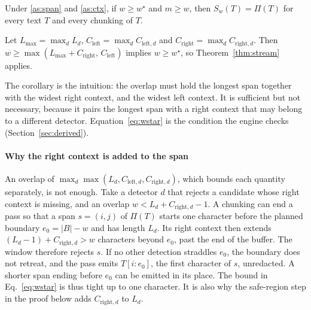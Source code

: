 \documentclass[pdflatex,sn-mathphys-num]{sn-jnl}
\theoremstyle{\ssThmStyle}
\theoremstyle{\ssDefStyle}
\begin{document}
\begin{theorem}\label{thm:stream}
Under \ref{as:span} and \ref{as:ctx}, if $w \ge w^{\star}$ and $m \ge w$, then $S_w(T) = \Pi(T)$ for every text $T$ and every chunking of $T$.
\end{theorem}

\begin{corollary}\label{cor:coarse}
Let $L_{\max} = \max_d L_d$, $C_{\mathrm{left}} = \max_d C_{\mathrm{left},d}$ and $C_{\mathrm{right}} = \max_d C_{\mathrm{right},d}$. Then $w \ge \max(L_{\max} + C_{\mathrm{right}},\, C_{\mathrm{left}})$ implies $w \ge w^{\star}$, so Theorem~\ref{thm:stream} applies.
\end{corollary}

The corollary is the intuition: the overlap must hold the longest span together with the widest right context, and the widest left context. It is sufficient but not necessary, because it pairs the longest span with a right context that may belong to a different detector. Equation~\eqref{eq:wstar} is the condition the engine checks (Section~\ref{sec:derived}).

\paragraph{Why the right context is added to the span}
An overlap of $\max_d \max(L_d, C_{\mathrm{left},d}, C_{\mathrm{right},d})$, which bounds each quantity separately, is not enough. Take a detector $d$ that rejects a candidate whose right context is missing, and an overlap $w < L_d + C_{\mathrm{right},d} - 1$. A chunking can end a pass so that a span $s = (i, j)$ of $\Pi(T)$ starts one character before the planned boundary $e_0 = |B| - w$ and has length $L_d$. Its right context then extends $(L_d - 1) + C_{\mathrm{right},d} > w$ characters beyond $e_0$, past the end of the buffer. The window therefore rejects $s$. If no other detection straddles $e_0$, the boundary does not retreat, and the pass emits $T[i : e_0]$, the first character of $s$, unredacted. A shorter span ending before $e_0$ can be emitted in its place. The bound in Eq.~\eqref{eq:wstar} is thus tight up to one character. It is also why the safe-region step in the proof below adds $C_{\mathrm{right},d}$ to $L_d$.
\end{document}
